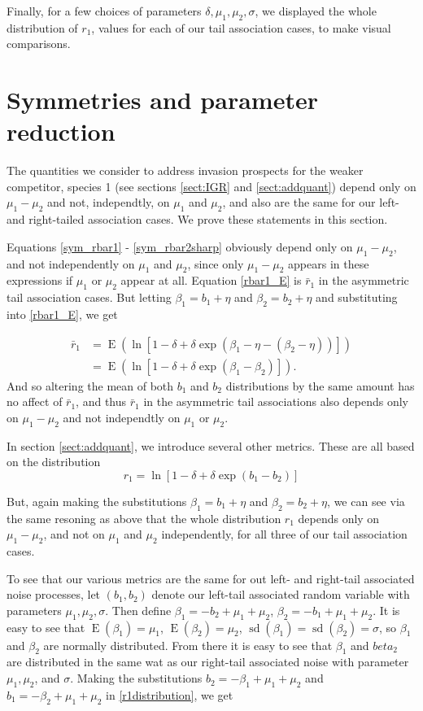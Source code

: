 \documentclass[letterpaper,11pt]{article}
\DeclareMathOperator{\EX}{E}%
\DeclareMathOperator{\sd}{sd}
\begin{document}
Finally, for a few choices of parameters $\delta, \mu_1, \mu_2, \sigma$, we displayed the whole distribution of $r_1$, values for each of our tail association cases, to make visual comparisons. 

\section{Symmetries and parameter reduction}

The quantities we consider to address invasion prospects for the weaker competitor, species 1 (see sections \ref{sect:IGR} and \ref{sect:addquant}) depend only on $\mu_1-\mu_2$ and not, independtly, on $\mu_1$ and $\mu_2$, and also are the same for our left- and right-tailed association cases. We prove these statements in this section.

Equations \ref{sym_rbar1} - \ref{sym_rbar2sharp} obviously depend only on $\mu_1-\mu_2$, and not independently on $\mu_1$ and $\mu_2$, since only $\mu_1-\mu_2$ appears in these expressions if $\mu_1$ or $\mu_2$ appear at all. Equation \ref{rbar1_E} is $\bar r_1$ in the asymmetric tail association cases. But letting $\beta_1 = b_1 + \eta$ and $\beta_2 = b_2 + \eta$ and substituting into \ref{rbar1_E}, we get 

\begin{align}
\bar r_1 &= \EX(\ln[1-\delta+\delta \exp(\beta_1-\eta-(\beta_2-\eta))])\\
&= \EX(\ln[1-\delta+\delta \exp(\beta_1-\beta_2)]).
\end{align}
\noindent And so altering the mean of both $b_1$ and $b_2$ distributions by the same amount has no affect of $\bar r_1$, and thus $\bar r_1$ in the asymmetric tail associations also depends only on $\mu_1 - \mu_2$ and not independtly on $\mu_1$ or $\mu_2$.

In section \ref{sect:addquant}, we introduce several other metrics. These are all based on the distribution 
\begin{equation}
r_1=\ln[1-\delta+\delta \exp(b_1-b_2)] \label{r1distribution}
\end{equation}

\noindent But, again making the substitutions $\beta_1 = b_1 + \eta$ and $\beta_2 = b_2 + \eta$, we can see via the same resoning as above that the whole distribution $r_1$ depends only on $\mu_1 - \mu_2$, and not on $\mu_1$ and $\mu_2$ independently, for all three of our tail association cases.

To see that our various metrics are the same for out left- and right-tail associated noise processes, let $(b_1,b_2)$ denote our left-tail associated random variable with parameters $\mu_1,\mu_2,\sigma$. Then define $\beta_1 = -b_2 + \mu_1 +\mu_2$, $\beta_2=-b_1+\mu_1+\mu_2$. It is easy to see that $\EX(\beta_1)=\mu_1$, $\EX(\beta_2)=\mu_2$, $\sd(\beta_1)=\sd(\beta_2)=\sigma$, so $\beta_1$ and $\beta_2$ are normally distributed. From there it is easy to see that $\beta_1$ and $beta_2$ are distributed in the same wat as our right-tail associated noise with parameter $\mu_1,\mu_2$, and $\sigma$. Making the substitutions $b_2 = -\beta_1 + \mu_1 + \mu_2$ and $b_1 = -\beta_2 + \mu_1+\mu_2$ in \ref{r1distribution}, we get
\end{document}
